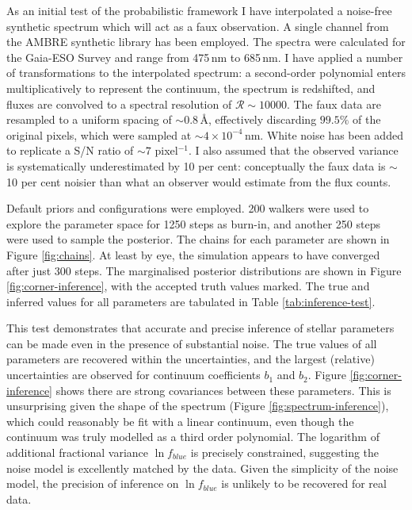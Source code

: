 \documentclass{aastex}
\begin{document}
As an initial test of the probabilistic framework I have interpolated a 
noise-free synthetic spectrum which will act as a faux observation. A single 
channel from the AMBRE synthetic library \citep{ambre} has been employed. The 
spectra were calculated for the Gaia-ESO Survey \citep{gaia-eso} and range from 
475\,nm to 685\,nm. I have applied a number of transformations to the 
interpolated spectrum: a second-order polynomial enters multiplicatively to 
represent the continuum, the spectrum is redshifted, and fluxes are convolved 
to a spectral resolution of $\mathcal{R} \sim 10000$. The faux data are resampled 
to a uniform spacing of $\sim{}0.8$\,\AA{}, effectively discarding $99.5\%$ of 
the original pixels, which were sampled at $\sim4\times10^{-4}$\,nm. White noise  
has been added to replicate a S/N ratio of $\sim 7$ pixel$^{-1}$. I also assumed 
that the observed variance is systematically underestimated by 10 per cent: 
conceptually the faux data is $\sim{}$10 per cent noisier than what an observer 
would estimate from the flux counts. 

Default priors and configurations were employed. 200 walkers were used to explore 
the parameter space for 1250 steps as burn-in, and another 250 steps were used to 
sample the posterior. The chains for each parameter are shown in Figure 
\ref{fig:chains}. At least by eye, the simulation appears to have converged after 
just 300 steps. The marginalised posterior distributions are shown in Figure 
\ref{fig:corner-inference}, with the accepted truth values marked. The true and 
inferred values for all parameters are tabulated in Table \ref{tab:inference-test}. 

This test demonstrates that accurate and precise inference of stellar parameters 
can be made even in the presence of substantial noise. The true values of all 
parameters are recovered within the uncertainties, and the largest (relative) 
uncertainties are observed for continuum coefficients $b_1$ and $b_2$. Figure 
\ref{fig:corner-inference} shows there are strong covariances between these 
parameters. This is unsurprising given the shape of the spectrum (Figure 
\ref{fig:spectrum-inference}), which could reasonably be fit with a linear 
continuum, even though the continuum was truly modelled as a third order 
polynomial. The logarithm of additional fractional variance $\ln{f_{blue}}$ is 
precisely constrained, suggesting the noise model is excellently matched by the 
data. Given the simplicity of the noise model, the precision of inference on 
$\ln{f_{blue}}$ is unlikely to be recovered for real data.
\end{document}
